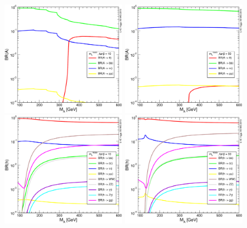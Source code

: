 \begin{figure}[tp]
     \begin{center}

            \includegraphics[width=0.47\textwidth]{figure/BR_higgs/YRHXS3_BR_fig31.pdf}
            \includegraphics[width=0.47\textwidth]{figure/BR_higgs/YRHXS3_BR_fig32.pdf}
            \includegraphics[width=0.47\textwidth]{figure/BR_higgs/YRHXS3_BR_fig35.pdf}
            \includegraphics[width=0.47\textwidth]{figure/BR_higgs/YRHXS3_BR_fig36.pdf}

\end{center}
\end{figure}
